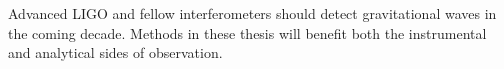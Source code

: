 \documentclass[leqno,twoside]{report}
\theoremstyle{plain}
\theoremstyle{definition}
\theoremstyle{remark}
\numberwithin{theorem}{chapter}        %
\begin{document}
Advanced LIGO and fellow interferometers should detect gravitational waves in the coming decade.
Methods in these thesis will benefit both the instrumental and analytical sides of observation.

\end{document}
